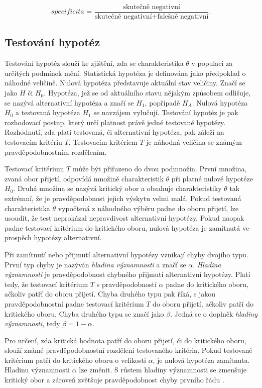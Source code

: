 \begin{equation}
    \textit{specificita = } \frac{\text{skutečně negativní}}{\text{skutečně negativní} + \text{falešně negativní}}.
\end{equation}

\subsection{Testování hypotéz}
Testování hypotéz slouží ke zjištění, zda se charakteristika $\theta$ v populaci za určitých podmínek mění. Statistická hypotéza
je definována jako předpoklad o náhodné veličině. Nulová hypotéza představuje aktuální stav veličiny.
Značí se jako $H$ či $H_0$. Hypotéza, jež se od aktuálního stavu nějakým způsobem odlišuje, se nazývá alternativní hypotéza
a značí se $H_1$, popřípadě $H_A$. Nulová hypotéza $H_0$ a testovaná hypotéza $H_1$ se navzájem vylučují. Testování hypotéz je
pak rozhodovací postup, který určí platnost právě jedné testované hypotézy. Rozhodnutí, zda platí testovaná, či alternativní hypotéza,
pak záleží na testovacím kritériu $T$. Testovacím kritériem $T$ je náhodná veličina se známým pravděpodobnostním rozdělením.

Testovací kritérium $T$ může být přiřazeno do dvou podmnožin. První množina, zvaná obor přijetí, odpovídá množině charakteristik $\theta$
při platné nulové hypotéze $H_0$. Druhá množina se nazývá kritický obor a obsahuje charakteristiky $\theta$ tak extrémní, že je 
pravděpodobnost jejich výskytu velmi malá. Pokud testovaná charakteristika $\theta$ vypočtená z náhodného výběru padne do oboru přijetí,
lze usoudit, že test neprokázal nepravdivost alternativní hypotézy. Pokud naopak padne testovací kritérium do kritického oboru, nulová
hypotéza je zamítnutá ve prospěch hypotézy alternativní.

Při zamítnutí nebo přijmutí alternativní hypotézy vznikají chyby dvojího typu. První typ chyby je nazýván \textit{hladina významnosti} a značí
se $\alpha$. \textit{Hladina významnosti} je pravděpodobnost chybného přijmutí alternativní hypotézy. Platí tedy, že testovací kritérium $T$ 
s pravděpodobností $\alpha$ padne do kritického oboru, ačkoliv patří do oboru přijetí. Chyba druhého typu pak říká, s jakou pravděpodobnostní
padne testovací kritérium $T$ do oboru přijetí, ačkoliv patří do kritického oboru. Chyba druhého typu se značí jako $\beta$. Jedná se o doplněk \textit{hladiny významnosti},
tedy $\beta = 1 - \alpha$.

Pro určení, zda kritická hodnota patří do oboru přijetí, či do kritického oboru, slouží známé pravděpodobnostní rozdělení testovaného kritéria.
Pokud testované kritérium patří do kritického oboru o velikosti $\alpha$, je nulová hypotéza zamítnuta. Hladinu významnosti $\alpha$ lze změnit.
S růstem hladiny významnosti se zmenšuje kritický obor a zároveň zvětšuje pravděpodobnost chyby prvního řádu
\cite{hebak_praktikum_2009}.

